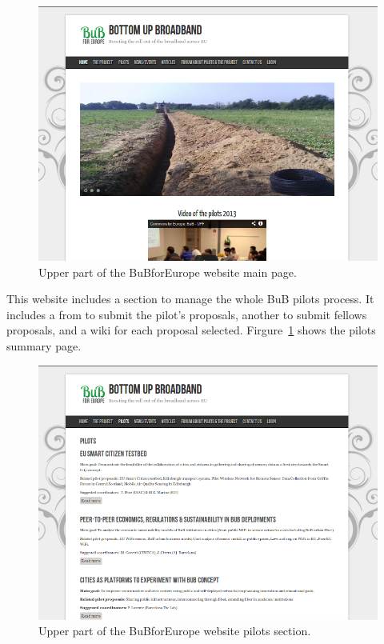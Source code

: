 \begin{figure}[H]
  \centering
  \includegraphics[width=0.95\linewidth]{sect2/figures/web_bub4EU_crop.png}
  \caption[BuBforEurope website]{Upper part of the BuBforEurope website main page.}
  \label{fig:bub_web}
\end{figure}

This website includes a section to manage the whole BuB pilots process. It includes a from to submit the pilot's proposals, another to submit fellows proposals, and a wiki for each proposal selected. Firgure~\ref{fig:bub_web} shows the pilots summary page.

\begin{figure}[H]
  \centering
  \includegraphics[width=0.95\linewidth]{sect2/figures/web_bub4eu_pilots_crop.png}
  \caption[BuBforEurope website]{Upper part of the BuBforEurope website pilots section.}
  \label{fig:bub_web_pilots}
\end{figure}


